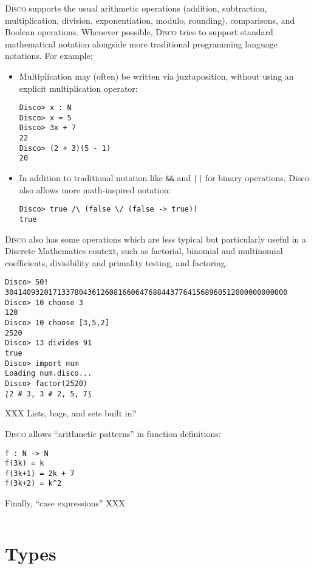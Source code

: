 \documentclass[submission,copyright,creativecommons]{eptcs}
\newcommand{\disco}{\textsc{Disco}\xspace}
\begin{document}
\disco supports the usual arithmetic operations (addition,
subtraction, multiplication, division, exponentiation, modulo,
rounding), comparisons, and Boolean operations.  Whenever possible,
\disco tries to support standard mathematical notation alongside more
traditional programming language notations.  For example:
\begin{itemize}
\item Multiplication may (often) be written via juxtaposition, without
  using an explicit multiplication operator:
\begin{verbatim}
Disco> x : N
Disco> x = 5
Disco> 3x + 7
22
Disco> (2 + 3)(5 - 1)
20
\end{verbatim}
\item In addition to traditional notation like \verb|&&| and
  \verb+||+ for binary operations, Disco also allows more
  math-inspired notation:
\begin{verbatim}
Disco> true /\ (false \/ (false -> true))
true
\end{verbatim}
\end{itemize}

\disco also has some operations which are less typical but
particularly useful in a Discrete Mathematics context, such as
factorial, binomial and multinomial coefficients, divisibility and
primality testing, and factoring.

\begin{verbatim}
Disco> 50!
30414093201713378043612608166064768844377641568960512000000000000
Disco> 10 choose 3
120
Disco> 10 choose [3,5,2]
2520
Disco> 13 divides 91
true
Disco> import num
Loading num.disco...
Disco> factor(2520)
⟅2 # 3, 3 # 2, 5, 7⟆
\end{verbatim}

XXX Lists, bags, and sets built in?

\disco allows ``arithmetic patterns'' in function definitions:
\begin{verbatim}
f : N -> N
f(3k) = k
f(3k+1) = 2k + 7
f(3k+2) = k^2
\end{verbatim}

Finally, ``case expressions'' XXX
\begin{verbatim}

\end{verbatim}

\section{Types}
\label{sec:types}
\end{document}
